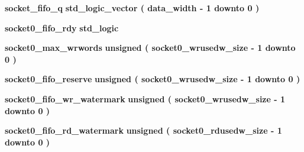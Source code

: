 \begin{DoxyCompactItemize}
\item 
{\bf socket\+\_\+fifo\+\_\+q} {\bfseries \textcolor{comment}{std\+\_\+logic\+\_\+vector}\textcolor{vhdlchar}{ }\textcolor{vhdlchar}{(}\textcolor{vhdlchar}{ }\textcolor{vhdlchar}{ }\textcolor{vhdlchar}{ }\textcolor{vhdlchar}{ }{\bfseries {\bf data\+\_\+width}} \textcolor{vhdlchar}{-\/}\textcolor{vhdlchar}{ } \textcolor{vhdldigit}{1} \textcolor{vhdlchar}{ }\textcolor{keywordflow}{downto}\textcolor{vhdlchar}{ }\textcolor{vhdlchar}{ } \textcolor{vhdldigit}{0} \textcolor{vhdlchar}{ }\textcolor{vhdlchar}{)}\textcolor{vhdlchar}{ }} 
\item 
{\bf socket0\+\_\+fifo\+\_\+rdy} {\bfseries \textcolor{comment}{std\+\_\+logic}\textcolor{vhdlchar}{ }} 
\item 
{\bf socket0\+\_\+max\+\_\+wrwords} {\bfseries \textcolor{comment}{unsigned}\textcolor{vhdlchar}{ }\textcolor{vhdlchar}{(}\textcolor{vhdlchar}{ }\textcolor{vhdlchar}{ }\textcolor{vhdlchar}{ }\textcolor{vhdlchar}{ }{\bfseries {\bf socket0\+\_\+wrusedw\+\_\+size}} \textcolor{vhdlchar}{-\/}\textcolor{vhdlchar}{ } \textcolor{vhdldigit}{1} \textcolor{vhdlchar}{ }\textcolor{keywordflow}{downto}\textcolor{vhdlchar}{ }\textcolor{vhdlchar}{ } \textcolor{vhdldigit}{0} \textcolor{vhdlchar}{ }\textcolor{vhdlchar}{)}\textcolor{vhdlchar}{ }} 
\item 
{\bf socket0\+\_\+fifo\+\_\+reserve} {\bfseries \textcolor{comment}{unsigned}\textcolor{vhdlchar}{ }\textcolor{vhdlchar}{(}\textcolor{vhdlchar}{ }\textcolor{vhdlchar}{ }\textcolor{vhdlchar}{ }\textcolor{vhdlchar}{ }{\bfseries {\bf socket0\+\_\+wrusedw\+\_\+size}} \textcolor{vhdlchar}{-\/}\textcolor{vhdlchar}{ } \textcolor{vhdldigit}{1} \textcolor{vhdlchar}{ }\textcolor{keywordflow}{downto}\textcolor{vhdlchar}{ }\textcolor{vhdlchar}{ } \textcolor{vhdldigit}{0} \textcolor{vhdlchar}{ }\textcolor{vhdlchar}{)}\textcolor{vhdlchar}{ }} 
\item 
{\bf socket0\+\_\+fifo\+\_\+wr\+\_\+watermark} {\bfseries \textcolor{comment}{unsigned}\textcolor{vhdlchar}{ }\textcolor{vhdlchar}{(}\textcolor{vhdlchar}{ }\textcolor{vhdlchar}{ }\textcolor{vhdlchar}{ }\textcolor{vhdlchar}{ }{\bfseries {\bf socket0\+\_\+wrusedw\+\_\+size}} \textcolor{vhdlchar}{-\/}\textcolor{vhdlchar}{ } \textcolor{vhdldigit}{1} \textcolor{vhdlchar}{ }\textcolor{keywordflow}{downto}\textcolor{vhdlchar}{ }\textcolor{vhdlchar}{ } \textcolor{vhdldigit}{0} \textcolor{vhdlchar}{ }\textcolor{vhdlchar}{)}\textcolor{vhdlchar}{ }} 
\item 
{\bf socket0\+\_\+fifo\+\_\+rd\+\_\+watermark} {\bfseries \textcolor{comment}{unsigned}\textcolor{vhdlchar}{ }\textcolor{vhdlchar}{(}\textcolor{vhdlchar}{ }\textcolor{vhdlchar}{ }\textcolor{vhdlchar}{ }\textcolor{vhdlchar}{ }{\bfseries {\bf socket0\+\_\+rdusedw\+\_\+size}} \textcolor{vhdlchar}{-\/}\textcolor{vhdlchar}{ } \textcolor{vhdldigit}{1} \textcolor{vhdlchar}{ }\textcolor{keywordflow}{downto}\textcolor{vhdlchar}{ }\textcolor{vhdlchar}{ } \textcolor{vhdldigit}{0} \textcolor{vhdlchar}{ }\textcolor{vhdlchar}{)}\textcolor{vhdlchar}{ }} 

\end{DoxyCompactItemize}
